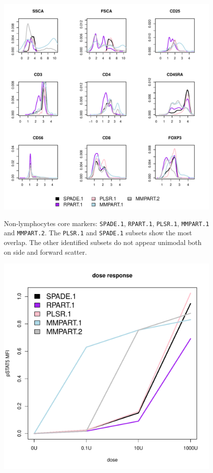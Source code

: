 \begin{figure}
\centering
\begin{minipage}{.65\textwidth}
\includegraphics[width=\linewidth]{figures/final-nonlymphocytes-clusters}
\end{minipage}
{ Non-lymphocytes core markers: \texttt{SPADE.1}, \texttt{RPART.1}, \texttt{PLSR.1}, \texttt{MMPART.1} and \texttt{MMPART.2}. }
{
    The \texttt{PLSR.1} and \texttt{SPADE.1} subsets show the most overlap.
    The other identified subsets do not appear unimodal both on side and forward scatter.
}
\begin{minipage}{.5\textwidth}
  \includegraphics[scale=0.4]{figures/final-nonlymphocytes-dose-response}

\end{minipage}
\end{figure}
